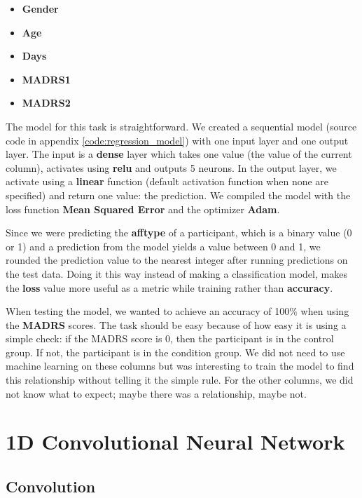 \begin{itemize}
      \item \textbf{Gender}
      \item \textbf{Age}
      \item \textbf{Days}
      \item \textbf{MADRS1}
      \item \textbf{MADRS2}
\end{itemize}

The model for this task is straightforward. We created a sequential model (source code in appendix \ref{code:regression_model}) with one input layer and one output layer. The input is a \textbf{dense} layer which takes one value (the value of the current column), activates using \textbf{relu} and outputs 5 neurons. In the output layer, we activate using a \textbf{linear} function (default activation function when none are specified) and return one value: the prediction. We compiled the model with the loss function \textbf{Mean Squared Error} and the optimizer \textbf{Adam}. 

Since we were predicting the \textbf{afftype} of a participant, which is a binary value (0 or 1) and a prediction from the model yields a value between 0 and 1, we rounded the prediction value to the nearest integer after running predictions on the test data. Doing it this way instead of making a classification model, makes the \textbf{loss} value more useful as a metric while training rather than \textbf{accuracy}. 

When testing the model, we wanted to achieve an accuracy of 100\% when using the \textbf{MADRS} scores. The task should be easy because of how easy it is using a simple check: if the MADRS score is 0, then the participant is in the control group. If not, the participant is in the condition group. We did not need to use machine learning on these columns but was interesting to train the model to find this relationship without telling it the simple rule. For the other columns, we did not know what to expect; maybe there was a relationship, maybe not.

\section{1D Convolutional Neural Network}

\subsection{Convolution}

